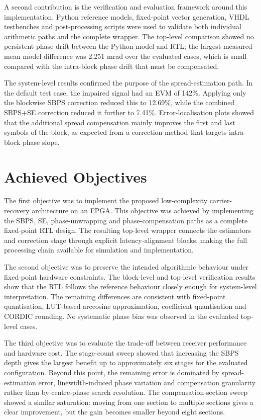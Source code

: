 A second contribution is the verification and evaluation framework around this implementation. Python reference models, fixed-point vector generation, \ac{VHDL} testbenches and post-processing scripts were used to validate both individual arithmetic paths and the complete wrapper. The top-level comparison showed no persistent phase drift between the Python model and \ac{RTL}; the largest measured mean model difference was 2.251 mrad over the evaluated cases, which is small compared with the intra-block phase drift that must be compensated.

The system-level results confirmed the purpose of the spread-estimation path. In the default test case, the impaired signal had an \ac{EVM} of 142\%. Applying only the blockwise \ac{SBPS} correction reduced this to 12.69\%, while the combined \ac{SBPS}+\ac{SE} correction reduced it further to 7.41\%. Error-localisation plots showed that the additional spread compensation mainly improves the first and last symbols of the block, as expected from a correction method that targets intra-block phase slope.

\section{Achieved Objectives}

The first objective was to implement the proposed low-complexity carrier-recovery architecture on an \ac{FPGA}. This objective was achieved by implementing the \ac{SBPS}, \ac{SE}, phase-unwrapping and phase-compensation paths as a complete fixed-point \ac{RTL} design. The resulting top-level wrapper connects the estimators and correction stage through explicit latency-alignment blocks, making the full processing chain available for simulation and implementation.

The second objective was to preserve the intended algorithmic behaviour under fixed-point hardware constraints. The block-level and top-level verification results show that the \ac{RTL} follows the reference behaviour closely enough for system-level interpretation. The remaining differences are consistent with fixed-point quantisation, \ac{LUT}-based arccosine approximation, coefficient quantisation and CORDIC rounding. No systematic phase bias was observed in the evaluated top-level cases.

The third objective was to evaluate the trade-off between receiver performance and hardware cost. The stage-count sweep showed that increasing the \ac{SBPS} depth gives the largest benefit up to approximately six stages for the evaluated configuration. Beyond this point, the remaining error is dominated by spread-estimation error, linewidth-induced phase variation and compensation granularity rather than by centre-phase search resolution. The compensation-section sweep showed a similar saturation: moving from one section to multiple sections gives a clear improvement, but the gain becomes smaller beyond eight sections.


